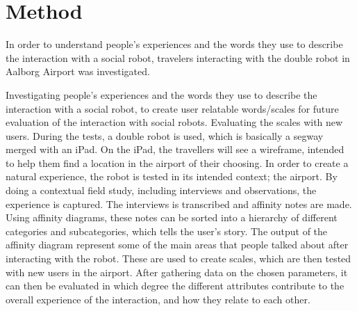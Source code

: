 \section{Method}
\label{Method}
%
In order to understand people's experiences and the words they use to describe the interaction with a social robot, travelers interacting with the double robot in Aalborg Airport was investigated. 

Investigating people's experiences and the words they use to describe the interaction with a social robot, to create user relatable words/scales for future evaluation of the interaction with social robots. Evaluating the scales with new users.
During the tests, a double robot is used, which is basically a segway merged with an iPad. On the iPad, the travellers will see a wireframe, intended to help them find a location in the airport of their choosing.
In order to create a natural experience, the robot is tested in its intended context; the airport. By doing a contextual field study, including interviews and observations, the experience is captured. The interviews is transcribed and affinity notes are made. Using affinity diagrams, these notes can be sorted into a hierarchy of different categories and subcategories, which tells the user’s story.
The output of the affinity diagram represent some of the main areas that people talked about after interacting with the robot. These are used to create scales, which are then tested with new users in the airport. After gathering data on the chosen parameters, it can then be evaluated in which degree the different attributes contribute to the overall experience of the interaction, and how they relate to each other.